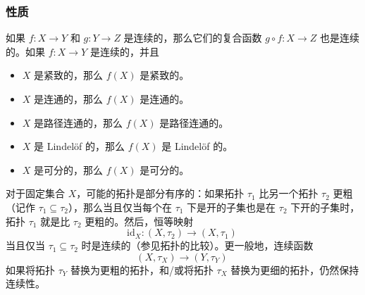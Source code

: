 \subsubsection{性质}
如果 $f: X \to Y$ 和 $g: Y \to Z$ 是连续的，那么它们的复合函数 $g \circ f: X \to Z$ 也是连续的。如果 $f: X \to Y$ 是连续的，并且
\begin{itemize}
\item $X$ 是紧致的，那么 $f(X)$ 是紧致的。
\item $X$ 是连通的，那么 $f(X)$ 是连通的。
\item $X$ 是路径连通的，那么 $f(X)$ 是路径连通的。
\item $X$ 是 Lindelöf 的，那么 $f(X)$ 是 Lindelöf 的。
\item $X$ 是可分的，那么 $f(X)$ 是可分的。
\end{itemize}
对于固定集合 $X$，可能的拓扑是部分有序的：如果拓扑 $\tau_1$ 比另一个拓扑 $\tau_2$ 更粗（记作 $\tau_1 \subseteq \tau_2$），那么当且仅当每个在 $\tau_1$ 下是开的子集也是在 $\tau_2$ 下开的子集时，拓扑 $\tau_1$ 就是比 $\tau_2$ 更粗的。然后，恒等映射
$$
\text{id}_X: (X, \tau_2) \to (X, \tau_1)~
$$
当且仅当 $\tau_1 \subseteq \tau_2$ 时是连续的（参见拓扑的比较）。更一般地，连续函数
$$
(X, \tau_X) \to (Y, \tau_Y)~
$$
如果将拓扑 $\tau_Y$ 替换为更粗的拓扑，和/或将拓扑 $\tau_X$ 替换为更细的拓扑，仍然保持连续性。
